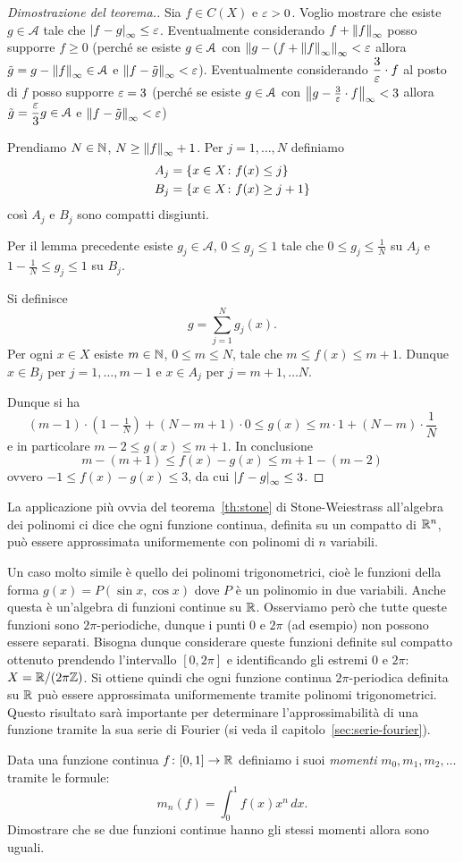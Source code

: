 \begin{proof}[Dimostrazione del teorema.]
Sia $f\in C(X)$ e $\varepsilon>0$.
Voglio mostrare che esiste $g\in {\mathcal A}$ tale che
${\left|f-g\right|}_\infty \le \varepsilon$.
Eventualmente considerando $f + {\left\Vert f\right\Vert}_\infty$ posso 
supporre $f\ge 0$ (perché se esiste $g\in \mathcal A$ con ${\left\Vert g - (f + {\left\Vert f\right\Vert}_\infty\right\Vert}_\infty < \varepsilon $ 
allora $\tilde g = g - {\left\Vert f\right\Vert}_\infty \in \mathcal A$ e ${\left\Vert f - \tilde g\right\Vert}_\infty < \varepsilon$).
Eventualmente considerando $\dfrac {3}{\varepsilon}\cdot f$ al posto di $f$ 
posso supporre $\varepsilon = 3$
(perché se esiste $g\in \mathcal A$ con ${\left\Vert g - \frac 3 {\varepsilon} \cdot f\right\Vert}_\infty < 3$
  allora $\tilde g = \dfrac {\varepsilon} 3 g \in \mathcal A$ e ${\left\Vert f - \tilde g\right\Vert}_\infty < \varepsilon$)

Prendiamo $N\in {\mathbb N}$, $N \ge {\left\Vert f\right\Vert}_\infty+1$.
Per $j=1, \dots, N$ definiamo 
\begin{align*}
    A_j &= {\left\{ x\in X\colon f(x) \le j \right\}}\\
    B_j &= {\left\{ x\in X\colon f(x) \ge j+1 \right\}}
\end{align*}
così $A_j$ e $B_j$ sono compatti disgiunti.

Per il lemma precedente esiste
$g_j\in{\mathcal A}$, $0\le g_j \le 1$ tale che
$0 \le g_j \le \tfrac 1 N$
su $A_j$ 
e $1 - \tfrac 1 N \le g_j \le 1$ su $B_j$.

Si definisce
\[
g = \sum_{j=1}^N g_j(x).
\]
Per ogni $x\in X$ esiste $m\in {\mathbb N}$, $0\le m\le N$, 
tale che $m\le f(x) \le m+1$. 
Dunque 
$x \in B_j$ per $j=1, \dots, m-1$
e $x \in A_j$ per $j=m+1, \dots N$.

Dunque si ha  
\[
  (m-1)\cdot (1-\tfrac 1 N) + (N-m+1)\cdot 0 
  \le g(x) 
  \le m\cdot 1 + (N-m)\cdot \frac 1 N
\]
e in particolare $m-2 \le g(x) \le m+1$.
In conclusione 
\[
m - (m+1)
\le f(x) - g(x) 
\le m+1 - (m-2)
\]
ovvero $-1 \le f(x) - g(x) \le 3$,
da cui ${\left|f-g\right|}_\infty \le 3$.
\end{proof}

La applicazione più ovvia del teorema~\ref{th:stone} di Stone-Weiestrass
all'algebra dei polinomi ci dice che ogni funzione continua,
definita su un compatto di ${\mathbb R}^n$, può essere approssimata 
uniformemente con polinomi di $n$ variabili.

Un caso molto simile è quello dei polinomi trigonometrici,
cioè le funzioni della forma $g(x) = P(\sin x, \cos x)$ dove $P$ è un polinomio in due variabili.
Anche questa è un'algebra di funzioni continue su ${\mathbb R}$.
Osserviamo però che tutte queste funzioni sono $2\pi$-periodiche, 
dunque i punti $0$ e $2\pi$ (ad esempio) non possono 
essere separati. 
Bisogna dunque considerare queste funzioni definite sul compatto 
ottenuto prendendo l'intervallo $[0,2\pi]$ e identificando gli estremi 
$0$ e $2\pi$: $X = {\mathbb R} / (2\pi {\mathbb Z})$.
Si ottiene quindi che ogni funzione continua $2\pi$-periodica 
definita su ${\mathbb R}$ può essere approssimata uniformemente
tramite polinomi trigonometrici. 
Questo risultato sarà importante per determinare l'approssimabilità 
di una funzione tramite la sua serie di Fourier (si veda il capitolo~\ref{sec:serie-fourier}).

\begin{exercise}
Data una funzione continua $f\colon [0,1]\to {\mathbb R}$ definiamo 
i suoi \emph{momenti} $m_0, m_1, m_2, \dots$ tramite le formule:
\[
  m_n(f) = \int_0^1 f(x) x^n\, dx.
\]
Dimostrare che se due funzioni continue hanno gli stessi momenti allora sono uguali.
\end{exercise}
